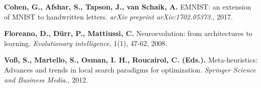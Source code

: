 \documentclass[lat]{simposium}
\begin{document}
\begin{thebibliography}{99}
\textbf{Cohen, G., Afshar, S., Tapson, J., van Schaik, A.} EMNIST: an extension of MNIST to handwritten letters. \emph{arXiv preprint arXiv:1702.05373.}, 2017.

\textbf{Floreano, D., Dürr, P., Mattiussi, C.} Neuroevolution: from architectures to learning. \emph{Evolutionary intelligence}, 1(1), 47-62, 2008.

\textbf{Voß, S., Martello, S., Osman, I. H., Roucairol, C. (Eds.).} Meta-heuristics: Advances and trends in local search paradigms for optimization. \emph{Springer Science and Business Media.}, 2012.

\end{thebibliography}
\end{document}
